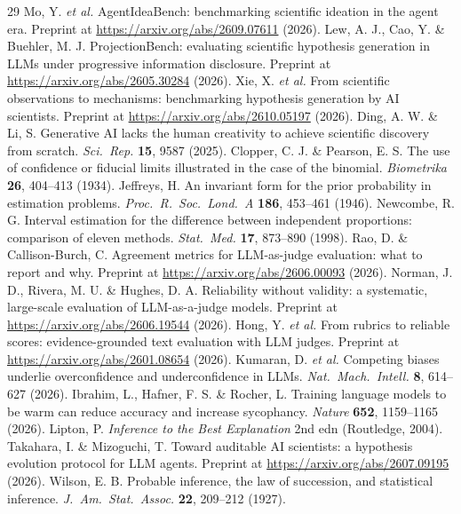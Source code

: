 \documentclass[11pt]{article}
\begin{document}
\begin{thebibliography}{29}
 Mo, Y. \emph{et al.} AgentIdeaBench: benchmarking scientific ideation in the agent era. Preprint at \url{https://arxiv.org/abs/2609.07611} (2026).
 Lew, A. J., Cao, Y. \& Buehler, M. J. ProjectionBench: evaluating scientific hypothesis generation in LLMs under progressive information disclosure. Preprint at \url{https://arxiv.org/abs/2605.30284} (2026).
 Xie, X. \emph{et al.} From scientific observations to mechanisms: benchmarking hypothesis generation by AI scientists. Preprint at \url{https://arxiv.org/abs/2610.05197} (2026).
 Ding, A. W. \& Li, S. Generative AI lacks the human creativity to achieve scientific discovery from scratch. \emph{Sci.\ Rep.} \textbf{15}, 9587 (2025).
 Clopper, C. J. \& Pearson, E. S. The use of confidence or fiducial limits illustrated in the case of the binomial. \emph{Biometrika} \textbf{26}, 404--413 (1934).
 Jeffreys, H. An invariant form for the prior probability in estimation problems. \emph{Proc.\ R.\ Soc.\ Lond.\ A} \textbf{186}, 453--461 (1946).
 Newcombe, R. G. Interval estimation for the difference between independent proportions: comparison of eleven methods. \emph{Stat.\ Med.} \textbf{17}, 873--890 (1998).
 Rao, D. \& Callison-Burch, C. Agreement metrics for LLM-as-judge evaluation: what to report and why. Preprint at \url{https://arxiv.org/abs/2606.00093} (2026).
 Norman, J. D., Rivera, M. U. \& Hughes, D. A. Reliability without validity: a systematic, large-scale evaluation of LLM-as-a-judge models. Preprint at \url{https://arxiv.org/abs/2606.19544} (2026).
 Hong, Y. \emph{et al.} From rubrics to reliable scores: evidence-grounded text evaluation with LLM judges. Preprint at \url{https://arxiv.org/abs/2601.08654} (2026).
 Kumaran, D. \emph{et al.} Competing biases underlie overconfidence and underconfidence in LLMs. \emph{Nat.\ Mach.\ Intell.} \textbf{8}, 614--627 (2026).
 Ibrahim, L., Hafner, F. S. \& Rocher, L. Training language models to be warm can reduce accuracy and increase sycophancy. \emph{Nature} \textbf{652}, 1159--1165 (2026).
 Lipton, P. \emph{Inference to the Best Explanation} 2nd edn (Routledge, 2004).
 Takahara, I. \& Mizoguchi, T. Toward auditable AI scientists: a hypothesis evolution protocol for LLM agents. Preprint at \url{https://arxiv.org/abs/2607.09195} (2026).
 Wilson, E. B. Probable inference, the law of succession, and statistical inference. \emph{J.\ Am.\ Stat.\ Assoc.} \textbf{22}, 209--212 (1927).
\end{thebibliography}
\end{document}
